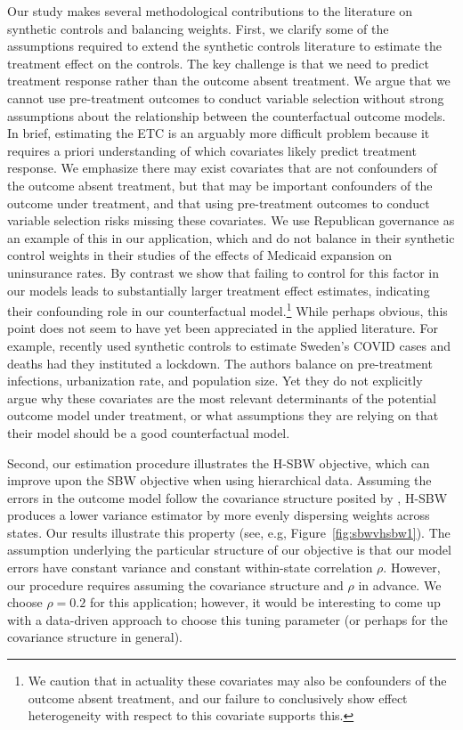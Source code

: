 Our study makes several methodological contributions to the literature on synthetic controls and balancing weights. First, we clarify some of the assumptions required to extend the synthetic controls literature to estimate the treatment effect on the controls. The key challenge is that we need to predict treatment response rather than the outcome absent treatment. We argue that we cannot use pre-treatment outcomes to conduct variable selection without strong assumptions about the relationship between the counterfactual outcome models. In brief, estimating the ETC is an arguably more difficult problem because it requires a priori understanding of which covariates likely predict treatment response. We emphasize there may exist covariates that are not confounders of the outcome absent treatment, but that may be important confounders of the outcome under treatment, and that using pre-treatment outcomes to conduct variable selection risks missing these covariates. We use Republican governance as an example of this in our application, which \cite{kaestner2017effects} and \cite{courtemanche2017early} do not balance in their synthetic control weights in their studies of the effects of Medicaid expansion on uninsurance rates. By contrast we show that failing to control for this factor in our models leads to substantially larger treatment effect estimates, indicating their confounding role in our counterfactual model.\footnote{We caution that in actuality these covariates may also be confounders of the outcome absent treatment, and our failure to conclusively show effect heterogeneity with respect to this covariate supports this.} While perhaps obvious, this point does not seem to have yet been appreciated in the applied literature. For example, \cite{born2020lockdowns} recently used synthetic controls to estimate Sweden's COVID cases and deaths had they instituted a lockdown. The authors balance on pre-treatment infections, urbanization rate, and population size. Yet they do not explicitly argue why these covariates are the most relevant determinants of the potential outcome model under treatment, or what assumptions they are relying on that their model should be a good counterfactual model.

Second, our estimation procedure illustrates the H-SBW objective, which can improve upon the SBW objective when using hierarchical data. Assuming the errors in the outcome model follow the covariance structure posited by \cite{kloek1981ols}, H-SBW produces a lower variance estimator by more evenly dispersing weights across states. Our results illustrate this property (see, e.g, Figure~\ref{fig:sbwvhsbw1}). The assumption underlying the particular structure of our objective is that our model errors have constant variance and constant within-state correlation $\rho$. However, our procedure requires assuming the covariance structure and $\rho$ in advance. We choose $\rho = 0.2$ for this application; however, it would be interesting to come up with a data-driven approach to choose this tuning parameter (or perhaps for the covariance structure in general). 


